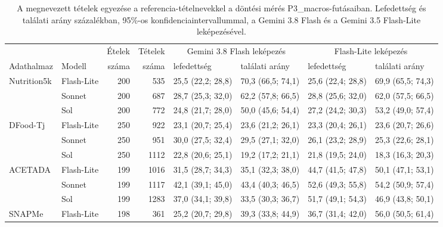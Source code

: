 \begin{table}[h]
\centering
\caption{A megnevezett tételek egyezése a referencia-tételnevekkel a döntési mérés 
P3\_macros-futásaiban. Lefedettség és találati arány százalékban, 95\%-os konfidenciaintervallummal, a 
Gemini 3.8 Flash és a Gemini 3.5 Flash-Lite leképezésével.}
\label{tab:felismeres}
\scriptsize
\setlength{\tabcolsep}{2.8pt}
\begin{tabular}{llrrllll}
\hline
 & & Ételek & Tételek & \multicolumn{2}{c}{Gemini 3.8 Flash leképezés} & \multicolumn{2}{c}{Flash-Lite leképezés} \\
Adathalmaz & Modell & száma & száma & lefedettség & találati arány & lefedettség & találati arány \\
\hline
Nutrition5k & Flash-Lite & 200 & 535 & 25,5 (22,2; 28,8) & 70,3 (66,5; 74,1) & 25,6 (22,4; 28,8) & 69,9 (65,5; 74,3) \\
 & Sonnet & 200 & 687 & 28,7 (25,3; 32,0) & 62,2 (57,8; 66,5) & 28,8 (25,6; 32,0) & 62,0 (57,5; 66,5) \\
 & Sol & 200 & 772 & 24,8 (21,7; 28,0) & 50,0 (45,6; 54,4) & 27,2 (24,2; 30,3) & 53,2 (49,0; 57,4) \\
\hline
DFood-Tj & Flash-Lite & 250 & 922 & 23,1 (20,7; 25,4) & 23,6 (21,2; 26,1) & 23,3 (20,4; 26,1) & 23,6 (20,7; 26,6) \\
 & Sonnet & 250 & 951 & 30,0 (27,5; 32,4) & 29,5 (27,1; 32,0) & 26,1 (23,2; 28,9) & 25,3 (22,6; 28,1) \\
 & Sol & 250 & 1112 & 22,8 (20,6; 25,1) & 19,2 (17,2; 21,1) & 21,8 (19,5; 24,0) & 18,3 (16,3; 20,3) \\
\hline
ACETADA & Flash-Lite & 199 & 1016 & 31,5 (28,7; 34,3) & 35,1 (32,3; 38,0) & 44,7 (41,5; 47,8) & 50,1 (47,1; 53,1) \\
 & Sonnet & 199 & 1117 & 42,1 (39,1; 45,0) & 43,4 (40,3; 46,5) & 52,6 (49,3; 55,8) & 54,2 (50,9; 57,4) \\
 & Sol & 199 & 1283 & 37,0 (34,1; 39,8) & 33,5 (30,3; 36,7) & 51,7 (49,1; 54,3) & 46,9 (43,8; 50,1) \\
\hline
SNAPMe & Flash-Lite & 198 & 361 & 25,2 (20,7; 29,8) & 39,3 (33,8; 44,9) & 36,7 (31,4; 42,0) & 56,0 (50,5; 61,4) \\
\hline
\end{tabular}
\end{table}

